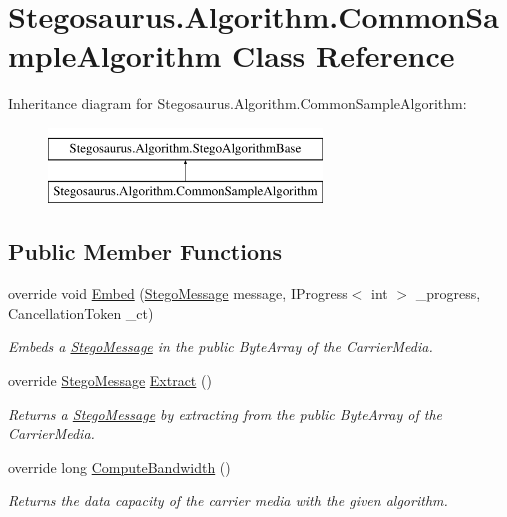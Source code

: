 \hypertarget{class_stegosaurus_1_1_algorithm_1_1_common_sample_algorithm}{}\section{Stegosaurus.\+Algorithm.\+Common\+Sample\+Algorithm Class Reference}
\label{class_stegosaurus_1_1_algorithm_1_1_common_sample_algorithm}
Inheritance diagram for Stegosaurus.\+Algorithm.\+Common\+Sample\+Algorithm\+:\begin{figure}[H]
\begin{center}
\leavevmode
\includegraphics[height=2.000000cm]{class_stegosaurus_1_1_algorithm_1_1_common_sample_algorithm}
\end{center}
\end{figure}
\subsection*{Public Member Functions}
\begin{DoxyCompactItemize}
\item 
override void \hyperlink{class_stegosaurus_1_1_algorithm_1_1_common_sample_algorithm_ab25967eede4bbf5ea54d64b168e4ae73}{Embed} (\hyperlink{class_stegosaurus_1_1_stego_message}{Stego\+Message} message, I\+Progress$<$ int $>$ \+\_\+progress, Cancellation\+Token \+\_\+ct)
\begin{DoxyCompactList}\small\item\em Embeds a \hyperlink{class_stegosaurus_1_1_stego_message}{Stego\+Message} in the public Byte\+Array of the Carrier\+Media. \end{DoxyCompactList}\item 
override \hyperlink{class_stegosaurus_1_1_stego_message}{Stego\+Message} \hyperlink{class_stegosaurus_1_1_algorithm_1_1_common_sample_algorithm_aab6487375c07bb4e77c719bb96605ad4}{Extract} ()
\begin{DoxyCompactList}\small\item\em Returns a \hyperlink{class_stegosaurus_1_1_stego_message}{Stego\+Message} by extracting from the public Byte\+Array of the Carrier\+Media. \end{DoxyCompactList}\item 
override long \hyperlink{class_stegosaurus_1_1_algorithm_1_1_common_sample_algorithm_aeb094a2d87af7b06f7710b79915164d8}{Compute\+Bandwidth} ()
\begin{DoxyCompactList}\small\item\em Returns the data capacity of the carrier media with the given algorithm. \end{DoxyCompactList}\end{DoxyCompactItemize}
